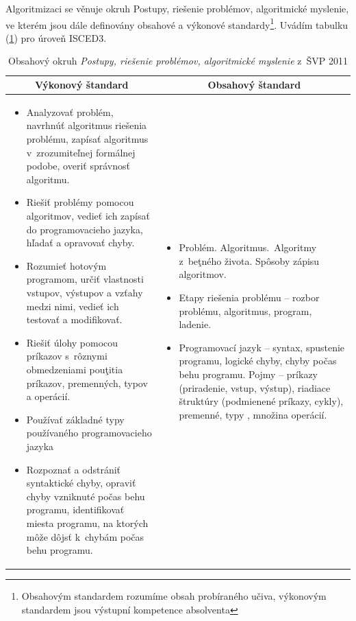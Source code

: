 \documentclass[FP,DP]{tulthesis}
\begin{document}
{{Algoritmizaci se věnuje okruh Postupy, riešenie problémov, algoritmické myslenie, ve kterém jsou dále definovány obsahové a výkonové standardy\footnote{Obsahovým standardem rozumíme obsah probíraného učiva, výkonovým standardem jsou výstupní kompetence absolventa}. Uvádím tabulku (\ref{table:2 }) pro úroveň ISCED3.
{\renewcommand{\arraystretch}{1.4}%
\begin{table}[t]
\footnotesize
\center
\caption{Obsahový okruh \textit {Postupy, riešenie problémov, algoritmické myslenie } z~ŠVP 2011} \label{table:2 }
\begin{tabular}{|l|l|}
\hline
\multicolumn{1}{|c|}{Výkonový štandard } & \multicolumn{1}{c|}{Obsahový štandard } \\\hline
\begin{minipage}[t]{0.45\textwidth}
\begin{itemize}[leftmargin=*,nosep]
  	\item Analyzovať problém, navrhnúť algoritmus riešenia problému, zapísať algoritmus
v~zrozumiteľnej formálnej podobe, overiť správnosť algoritmu.
	\item Riešiť problémy pomocou algoritmov, vedieť ich zapísať do programovacieho jazyka,
hľadať a opravovať chyby.
\item Rozumieť hotovým programom, určiť vlastnosti vstupov, výstupov a vzťahy medzi
nimi, vedieť ich testovať a modifikovať.

\item Riešiť úlohy pomocou príkazov s~rôznymi obmedzeniami pouţitia príkazov,
premenných, typov a operácií.
\item Používať základné typy používaného programovacieho jazyka
\item Rozpoznať a odstrániť syntaktické chyby, opraviť chyby vzniknuté počas behu
programu, identifikovať miesta programu, na ktorých môže dôjsť k~chybám počas
behu programu.

\end{itemize}
  \end{minipage} &
  \begin{minipage}[t]{0.45\textwidth}
\begin{itemize}[leftmargin=*,nosep]
  	\item Problém. Algoritmus.~Algoritmy z~beţného života. Spôsoby zápisu algoritmov.
	\item Etapy riešenia problému – rozbor problému, algoritmus, program, ladenie.
\item Programovací jazyk -- syntax, spustenie programu, logické chyby, chyby počas behu
programu. Pojmy – príkazy (priradenie, vstup, výstup), riadiace štruktúry (podmienené
príkazy, cykly), premenné, typy , množina operácií.
\end{itemize}
 \end{minipage}


\end{tabular}
\end{table}}}}
\end{document}
